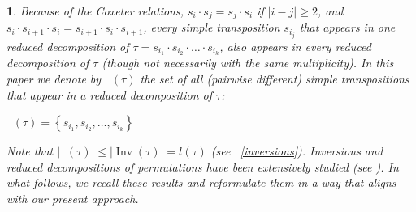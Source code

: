 \documentclass[a4 paper,12pt]{article}
\DeclareMathOperator{\Inv}{Inv}
\DeclareMathOperator{\Red}{R_{\textbf{d}}}
\newtheorem{subnum}{}[numeris]
\begin{document}
\begin{subnum}  Because of the Coxeter relations, $s_i\cdot  s_j = s_j\cdot  s_i$ if $\left|i-j\right|\geq 2$, and $s_i\cdot  s_{i+1}\cdot  s_{i} = s_{i+1}\cdot  s_i\cdot  s_{i+1}$,  every  simple transposition $s_{i_j}$ that appears in one reduced decomposition of $\tau = s_{i_1} \cdot s_{i_2} \cdot \ldots \cdot s_{i_k}$, 
also appears in every reduced decomposition of $\tau$ (though not necessarily with the same multiplicity). In this paper we denote by $\Red(\tau)$ the set of all (pairwise different) simple transpositions that appear in a reduced decomposition of $\tau$: 
\begin{center}
$\Red(\tau) = \left\{ s_{i_1} , s_{i_2} ,\ldots , s_{i_k}\right\}$
\end{center}
Note that $\left|\Red(\tau)\right| \leq \left|\Inv(\tau)\right| = l(\tau)$ (see ~\ref{inversions}).  Inversions and reduced decompositions of permutations have been extensively studied (see \cite{Bjor}). In what follows, we recall these results and reformulate them in a way that aligns with our present approach.
\label{reduced_decom}
\end{subnum}

  
	
	




 
\end{document}
